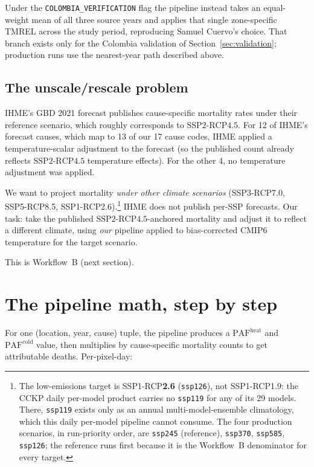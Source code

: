 \documentclass[11pt]{article}
\newcommand{\PAF}{\text{PAF}}
\newcommand{\SSPtwo}{\text{SSP2{-}RCP4.5}}
\begin{document}
Under the \texttt{COLOMBIA\_VERIFICATION} flag the pipeline instead takes
an equal-weight mean of all three source years and applies that single
zone-specific TMREL across the study period, reproducing Samuel Cuervo's
choice. That branch exists only for the Colombia validation of
Section~\ref{sec:validation}; production runs use the nearest-year path
described above.

\subsection{The unscale/rescale problem}

IHME's GBD 2021 forecast publishes cause-specific mortality rates under
their reference scenario, which roughly corresponds to $\SSPtwo$. For 12
of IHME's forecast causes, which map to 13 of our 17 cause codes, IHME
applied a temperature-scalar adjustment to the forecast (so the published
count already reflects $\SSPtwo$ temperature effects). For the other 4, no
temperature adjustment was applied.

We want to project mortality \emph{under other climate scenarios}
(SSP3-RCP7.0, SSP5-RCP8.5, SSP1-RCP2.6).\footnote{The low-emissions
target is SSP1-RCP\textbf{2.6} (\texttt{ssp126}), not SSP1-RCP1.9: the
CCKP daily per-model product carries no \texttt{ssp119} for any of its 29
models. There, \texttt{ssp119} exists only as an annual multi-model-ensemble
climatology, which this daily per-model pipeline cannot consume. The four
production scenarios, in run-priority order, are \texttt{ssp245}
(reference), \texttt{ssp370}, \texttt{ssp585}, \texttt{ssp126}; the
reference runs first because it is the Workflow~B denominator for every
target.} IHME does not publish per-SSP forecasts. Our task: take the published $\SSPtwo$-anchored mortality and
adjust it to reflect a different climate, using \emph{our} pipeline
applied to bias-corrected CMIP6 temperature for the target scenario.

This is Workflow~B (next section).

\section{The pipeline math, step by step}
\label{sec:pipeline-math}

For one (location, year, cause) tuple, the pipeline produces a
$\PAF^{\text{heat}}$ and $\PAF^{\text{cold}}$ value, then multiplies by
cause-specific mortality counts to get attributable deaths.
Per-pixel-day:
\end{document}
